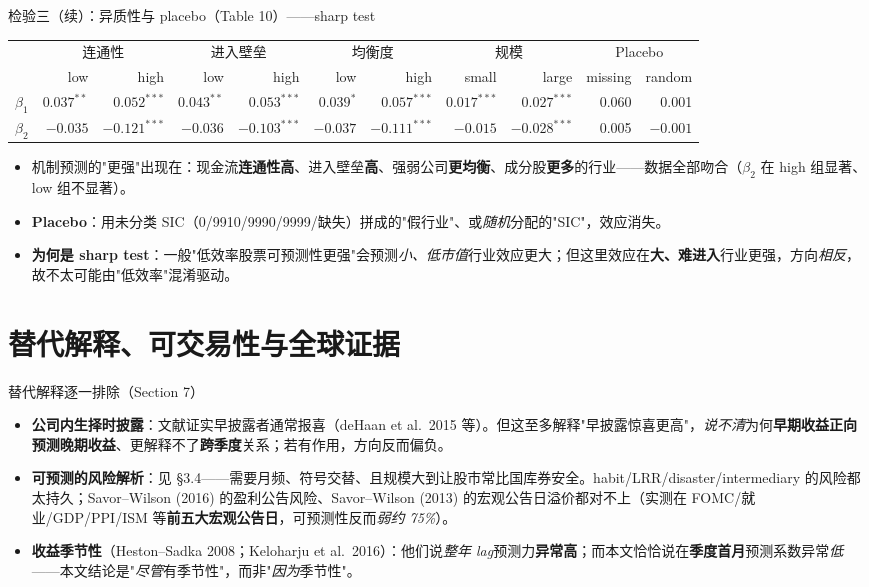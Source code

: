 \documentclass[aspectratio=169,10pt]{beamer}
\newcommand{\tinytab}{\tiny\setlength{\tabcolsep}{2.2pt}\renewcommand{\arraystretch}{1.08}}
\begin{document}
\begin{frame}{检验三（续）：异质性与 placebo（Table 10）——sharp test}
	\tinytab
	\begin{tabular}{lrrrrrrrrrr}
		\toprule
		& \multicolumn{2}{c}{连通性} & \multicolumn{2}{c}{进入壁垒} & \multicolumn{2}{c}{均衡度} & \multicolumn{2}{c}{规模} & \multicolumn{2}{c}{Placebo} \\
		& low & high & low & high & low & high & small & large & missing & random \\
		\midrule
		$\beta_1$ & $0.037^{**}$ & $0.052^{***}$ & $0.043^{**}$ & $0.053^{***}$ & $0.039^{*}$ & $0.057^{***}$ & $0.017^{***}$ & $0.027^{***}$ & 0.060 & 0.001 \\
		$\beta_2$ & $-0.035$ & $-0.121^{***}$ & $-0.036$ & $-0.103^{***}$ & $-0.037$ & $-0.111^{***}$ & $-0.015$ & $-0.028^{***}$ & 0.005 & $-0.001$ \\
		\bottomrule
	\end{tabular}
	\vspace{4pt}
	\begin{itemize}
		\item 机制预测的"更强"出现在：现金流\textbf{连通性高}、进入壁垒\textbf{高}、强弱公司\textbf{更均衡}、成分股\textbf{更多}的行业——数据全部吻合（$\beta_2$ 在 high 组显著、low 组不显著）。
		\item \textbf{Placebo}：用未分类 SIC（0/9910/9990/9999/缺失）拼成的"假行业"、或\emph{随机}分配的"SIC"，效应消失。
		\item \textbf{为何是 sharp test}：一般"低效率股票可预测性更强"会预测\emph{小、低市值}行业效应更大；但这里效应在\textbf{大、难进入}行业更强，方向\emph{相反}，故不太可能由"低效率"混淆驱动。
	\end{itemize}
\end{frame}

\section{替代解释、可交易性与全球证据}

\begin{frame}{替代解释逐一排除（Section 7）}
	\begin{itemize}
		\item \textbf{公司内生择时披露}：文献证实早披露者通常报喜（deHaan et al.\ 2015 等）。但这至多解释"早披露惊喜更高"，\emph{说不清}为何\textbf{早期收益正向预测晚期收益}、更解释不了\textbf{跨季度}关系；若有作用，方向反而偏负。
		\item \textbf{可预测的风险解析}：见 §3.4——需要月频、符号交替、且规模大到让股市常比国库券安全。habit/LRR/disaster/intermediary 的风险都太持久；Savor--Wilson (2016) 的盈利公告风险、Savor--Wilson (2013) 的宏观公告日溢价都对不上（实测在 FOMC/就业/GDP/PPI/ISM 等\textbf{前五大宏观公告日}，可预测性反而\emph{弱约 75\%}）。
		\item \textbf{收益季节性}（Heston--Sadka 2008；Keloharju et al.\ 2016）：他们说\emph{整年 lag}预测力\textbf{异常高}；而本文恰恰说在\textbf{季度首月}预测系数异常\emph{低}——本文结论是"\emph{尽管}有季节性"，而非"\emph{因为}季节性"。
	\end{itemize}
\end{frame}
\end{document}
